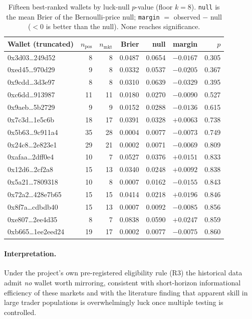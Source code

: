 \documentclass[11pt]{article}
\begin{document}
\begin{table}[h]
\centering
\caption{Fifteen best-ranked wallets by luck-null $p$-value (floor $k=8$). \texttt{null} is the
mean Brier of the Bernoulli-price null; \texttt{margin} $=$ observed $-$ null ($<0$ is better
than the null). None reaches significance.}
\label{tab:best}
\small
\begin{tabular}{@{}lrrrrrr@{}}
\toprule
Wallet (truncated) & $n_{\text{pos}}$ & $n_{\text{mkt}}$ & Brier & null & margin & $p$ \\
\midrule
0x3d03\dots249d52 &  8 &  8 & 0.0487 & 0.0654 & $-0.0167$ & 0.305 \\
0xed45\dots970d29 &  9 &  8 & 0.0332 & 0.0537 & $-0.0205$ & 0.367 \\
0x9cdd\dots3d3e97 &  8 &  8 & 0.0310 & 0.0639 & $-0.0329$ & 0.395 \\
0xc6dd\dots913987 & 11 & 11 & 0.0180 & 0.0270 & $-0.0090$ & 0.527 \\
0x9aeb\dots5b2729 &  9 &  9 & 0.0152 & 0.0288 & $-0.0136$ & 0.615 \\
0x7c3d\dots1e5c6b & 18 & 17 & 0.0391 & 0.0328 & $+0.0063$ & 0.738 \\
0x5b63\dots9c911a4 & 35 & 28 & 0.0004 & 0.0077 & $-0.0073$ & 0.749 \\
0x24c8\dots2e823e1 & 29 & 21 & 0.0002 & 0.0071 & $-0.0069$ & 0.809 \\
0xafaa\dots2dff0e4 & 10 &  7 & 0.0527 & 0.0376 & $+0.0151$ & 0.833 \\
0x12d6\dots2cf2a8 & 15 & 13 & 0.0340 & 0.0248 & $+0.0092$ & 0.838 \\
0x5a21\dots7809318 & 10 &  8 & 0.0007 & 0.0162 & $-0.0155$ & 0.843 \\
0x72a2\dots428e7b65 & 15 & 15 & 0.0414 & 0.0218 & $+0.0196$ & 0.846 \\
0x8f7a\dots cdbdb40 & 15 & 13 & 0.0007 & 0.0092 & $-0.0085$ & 0.856 \\
0xe807\dots2ee4d35 &  8 &  7 & 0.0838 & 0.0590 & $+0.0247$ & 0.859 \\
0xb665\dots1ee2eed24 & 19 & 17 & 0.0002 & 0.0077 & $-0.0075$ & 0.860 \\
\bottomrule
\end{tabular}
\end{table}

\paragraph{Interpretation.} Under the project's own pre-registered eligibility rule (R3) the
historical data admit \emph{no} wallet worth mirroring, consistent with short-horizon
informational efficiency of these markets and with the literature finding that apparent skill
in large trader populations is overwhelmingly luck once multiple testing is controlled.
\end{document}
